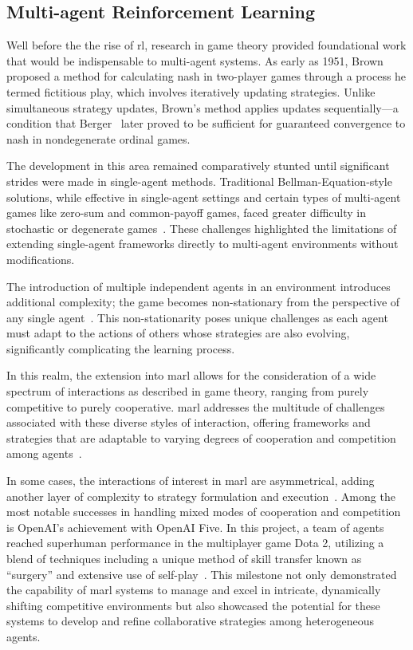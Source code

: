     \subsection*{Multi-agent Reinforcement Learning}%

Well before the the rise of \gls*{rl}, research in game theory 
provided foundational work that would be indispensable to multi-agent systems.
As early as 1951, Brown~\cite{brown1951iterative} proposed a method for 
calculating \gls{nash} in two-player games through a process he termed 
fictitious play, which involves iteratively updating strategies. 
Unlike simultaneous strategy updates, Brown's method applies updates 
sequentially—a condition that Berger~\cite{berger2005, berger2007} 
later proved to be sufficient for guaranteed convergence to 
\gls{nash} in nondegenerate ordinal games. 

The development in this area remained comparatively stunted until 
significant strides were made in single-agent methods. 
Traditional Bellman-Equation-style solutions, while effective in single-agent 
settings and certain types of multi-agent games like zero-sum and 
common-payoff games, faced greater difficulty in stochastic or 
degenerate games~\cite{shoham2007}.
These challenges highlighted the limitations of extending single-agent 
frameworks directly to multi-agent environments without modifications.

The introduction of multiple independent agents in an environment introduces 
additional complexity; the game becomes non-stationary from 
the perspective of any single agent~\cite{busoniu2008}. 
This non-stationarity poses unique challenges as each agent must adapt 
to the actions of others whose strategies are also evolving, 
significantly complicating the learning process.

In this realm, the extension into \gls{marl} allows for the consideration 
of a wide spectrum of interactions as described in game theory, 
ranging from purely competitive to purely cooperative. 
\gls{marl} addresses the multitude of challenges associated with these 
diverse styles of interaction, offering frameworks and strategies that 
are adaptable to varying degrees of cooperation and competition among 
agents~\cite{lowe2020}.

In some cases, the interactions of interest in \gls{marl} are asymmetrical, 
adding another layer of complexity to strategy formulation and 
execution~\cite*{sun2023}.
Among the most notable successes in handling mixed modes of cooperation 
and competition is OpenAI's achievement with OpenAI Five. In this project, 
a team of agents reached superhuman performance in the multiplayer game Dota 2,
utilizing a blend of techniques including a unique method of skill transfer 
known as ``surgery'' and extensive use of self-play~\cite{berner2019}.
This milestone not only demonstrated the capability of \gls{marl} systems to 
manage and excel in intricate, dynamically shifting competitive environments 
but also showcased the potential for these systems to develop and refine 
collaborative strategies among heterogeneous agents.

